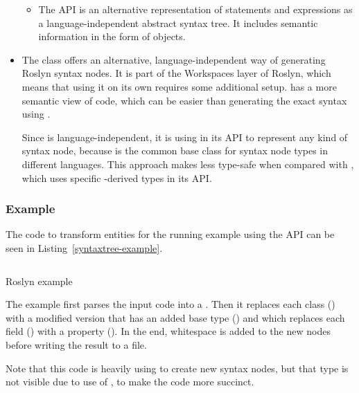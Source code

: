 \begin{itemize}
\begin{itemize}
\item The  \ac{API} is an alternative representation of statements and expressions as a language-independent abstract syntax tree. It includes semantic information in the form of  objects.

\end{itemize}

\item The  class offers an alternative, language-independent way of generating Roslyn syntax nodes. It is part of the Workspaces layer of Roslyn, which means that using it on its own requires some additional setup.  has a more semantic view of code, which can be easier than generating the exact syntax using .

Since  is language-independent, it is using  in its \ac{API} to represent any kind of syntax node, because  is the common base class for syntax node types in different languages. This approach makes  less type-safe when compared with , which uses specific -derived types in its \ac{API}.
\end{itemize}

\subsubsection{Example}

The code to transform entities for the running example using the  \ac{API} can be seen in Listing~\ref{syntaxtree-example}.

\begin{listing}
\inputminted[firstline=15,lastline=48]{csharp}{samples/Roslyn/Program.cs}
\caption{Roslyn  example}
\label{syntaxtree-example}
\end{listing}

The example first parses the input code into a . Then it replaces each class () with a modified version that has an added base type () and which replaces each field () with a property (). In the end, whitespace is added to the new nodes before writing the result to a file.

Note that this code is heavily using  to create new syntax nodes, but that type is not visible due to use of , to make the code more succinct.

